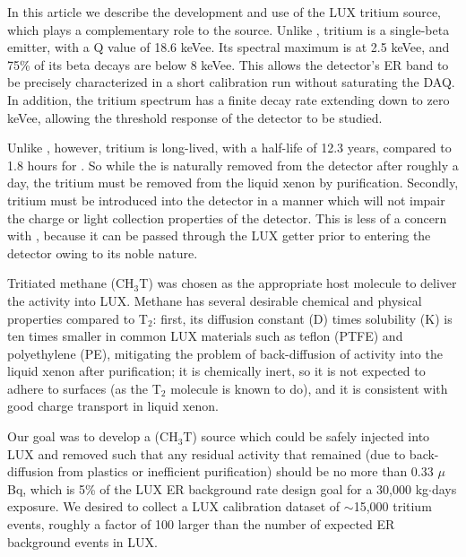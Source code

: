 In this article we describe the development and use of the LUX tritium source, which plays a complementary role to the \krsrc source. Unlike \krsrc, tritium is a single-beta emitter, with a Q value of 18.6 keVee. Its spectral maximum is at 2.5 keVee, and 75\% of its beta decays are below 8 keVee. This allows the detector's ER band to be precisely characterized in a short calibration run without saturating the DAQ. In addition, the tritium spectrum has a finite decay rate extending down to zero keVee, allowing the threshold response of the detector to be studied.

Unlike \krsrc, however, tritium is long-lived, with a half-life of 12.3 years, compared to 1.8 hours for \krsrc. So while the \krsrc is naturally removed from the detector after roughly a day, the tritium must be removed from the liquid xenon by purification. Secondly, tritium must be introduced into the detector in a manner which will not impair the charge or light collection properties of the detector. This is less of a concern with \krsrc, because it can be passed through the LUX getter prior to entering the detector owing to its noble nature. 

Tritiated methane (CH$_3$T) was chosen as the appropriate host molecule to deliver the activity into LUX. Methane has several desirable chemical and physical properties compared to T$_2$: first, its diffusion constant (D) times solubility (K) is ten times smaller in common LUX materials such as teflon (PTFE) and polyethylene (PE)\cite{miyake:1983}, mitigating the problem of back-diffusion of activity into the liquid xenon after purification; it is chemically inert, so it is not expected to adhere to surfaces (as the T$_2$ molecule is known to do), and it is consistent with good charge transport in liquid xenon.

Our goal was to develop a (CH$_3$T) source which could be safely injected into LUX and removed such that any residual activity that remained (due to back-diffusion from plastics or inefficient purification) should be no more than 0.33 $\mu$Bq, which is 5\% of the LUX ER background rate design goal for a 30,000 kg$\cdot$days exposure. We desired to collect a LUX calibration dataset of $\sim$15,000 tritium events, roughly a factor of 100 larger than the number of expected ER background events in LUX. 

